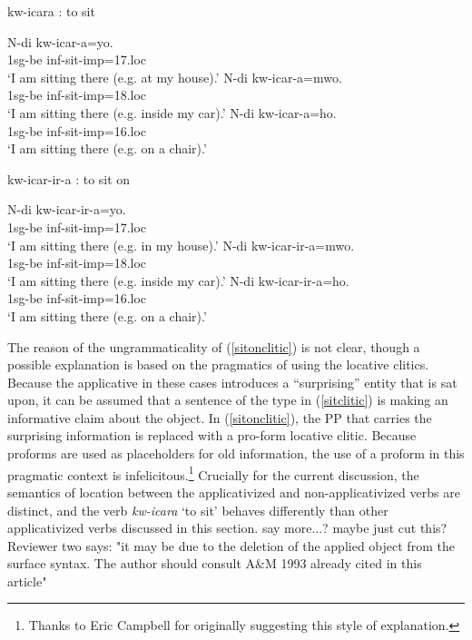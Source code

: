 \documentclass[output=paper]{langsci/langscibook}
\begin{document}
\begin{exe}
	\ex\label{sitclitic} {\sc kw-icara} : to sit \begin{xlist}
		\ex\gll N-di kw-icar-a=yo.\\
				1{\sc sg-be} {\sc inf-}sit{-\sc imp=17.loc}\\
			\glt `I am sitting there (e.g. at my house).'
		\ex\gll N-di kw-icar-a=mwo. \\
1{\sc sg-be} {\sc inf-}sit{-\sc imp=18.loc}\\
			\glt `I am sitting there (e.g. inside my car).'
		\ex\gll N-di kw-icar-a=ho.\\
				{\sc 1sg-be} {\sc inf-}sit{-\sc imp=16.loc}\\
	\glt `I am sitting there (e.g. on a chair).'
	\end{xlist}
	\ex\label{sitonclitic} {\sc kw-icar-ir-a} : to sit on\begin{xlist}
		\ex\gll *N-di kw-icar-ir-a=yo.\\
				1{\sc sg-be} {\sc inf-}sit{-\sc imp=17.loc}\\
			\glt `I am sitting there (e.g. in my house).'
		\ex\gll *N-di kw-icar-ir-a=mwo. \\
1{\sc sg-be} {\sc inf-}sit{-\sc imp=18.loc}\\
			\glt `I am sitting there (e.g. inside my car).'
		\ex\gll *N-di kw-icar-ir-a=ho.\\
				1{\sc sg-be} {\sc inf-}sit{-\sc imp=16.loc}\\
			\glt `I am sitting there (e.g. on a chair).'

\end{xlist}

\end{exe}
%
The reason of the ungrammaticality of (\ref{sitonclitic}) is not clear, though a possible explanation is based on the pragmatics of using the locative clitics. Because the applicative in these cases introduces a ``surprising'' entity that is sat upon, it can be assumed that a sentence of the type in (\ref{sitclitic}) is making an informative claim about the object. In (\ref{sitonclitic}), the PP that carries the surprising information is replaced with a pro-form locative clitic. Because proforms are used as placeholders for old information, the use of a proform in this pragmatic context is infelicitous.\footnote{Thanks to Eric Campbell for originally suggesting this style of explanation.} Crucially for the current discussion, the semantics of location between the applicativized and  non-applicativized verbs are distinct, and the verb \emph{kw-icara} `to sit' behaves differently than other applicativized verbs discussed in this section. {\comment say more...? maybe just cut this? Reviewer two says: "it may be due to the deletion of the applied object from the surface syntax. The author should consult A\&M 1993 already cited in this article"}
\fi
\end{document}
